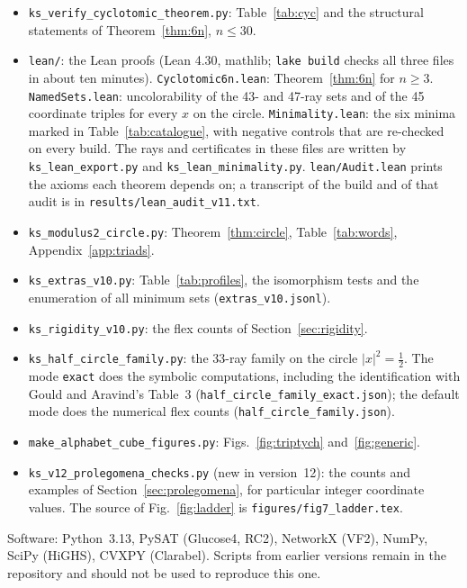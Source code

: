 \begin{itemize}
files \texttt{three\_symbol\_real\_*} under \texttt{results/}.  It uses \texttt{ks\_certify\_fast4.py}, the
certifier with the two reductions of Section~\ref{sec:methods}, which the mode \texttt{one4} of
\texttt{ks\_conjugate\_closed\_theorem.py} also uses.
\item \texttt{ks\_verify\_cyclotomic\_theorem.py}: Table~\ref{tab:cyc} and the structural
statements of Theorem~\ref{thm:6n}, $n\le30$.
\item \texttt{lean/}: the Lean proofs (Lean 4.30, mathlib; \texttt{lake build} checks all
three files in about ten minutes).  \texttt{Cyclotomic6n.lean}: Theorem~\ref{thm:6n} for
$n\ge3$.  \texttt{NamedSets.lean}: uncolorability of the 43- and 47-ray sets and of the 45
coordinate triples for every $x$ on the circle.  \texttt{Minimality.lean}: the six minima marked in
Table~\ref{tab:catalogue}, with negative controls that are re-checked on every build.  The rays
and certificates in these files are written by \texttt{ks\_lean\_export.py} and
\texttt{ks\_lean\_minimality.py}.  \texttt{lean/Audit.lean} prints the axioms each theorem
depends on; a transcript of the build and of that audit is in
\texttt{results/lean\_audit\_v11.txt}.
\item \texttt{ks\_modulus2\_circle.py}: Theorem~\ref{thm:circle}, Table~\ref{tab:words},
Appendix~\ref{app:triads}.
\item \texttt{ks\_extras\_v10.py}: Table~\ref{tab:profiles}, the isomorphism tests and the
enumeration of all minimum sets (\texttt{extras\_v10.jsonl}).
\item \texttt{ks\_rigidity\_v10.py}: the flex counts of Section~\ref{sec:rigidity}.
\item \texttt{ks\_half\_circle\_family.py}: the 33-ray family on the circle
$|x|^2=\tfrac12$.  The mode \texttt{exact} does the symbolic computations, including the
identification with Gould and Aravind's Table~3 (\texttt{half\_circle\_family\_exact.json}); the
default mode does the numerical flex counts (\texttt{half\_circle\_family.json}).
\item \texttt{make\_alphabet\_cube\_figures.py}: Figs.~\ref{fig:triptych} and~\ref{fig:generic}.
\item \texttt{ks\_v12\_prolegomena\_checks.py} (new in version~12): the counts and examples of
Section~\ref{sec:prolegomena}, for particular integer coordinate values.  The source of
Fig.~\ref{fig:ladder} is \texttt{figures/fig7\_ladder.tex}.
\end{itemize}

Software: Python~3.13, PySAT (Glucose4, RC2), NetworkX (VF2), NumPy, SciPy (HiGHS), CVXPY
(Clarabel).  Scripts from earlier versions remain in the repository and should not be used to
reproduce this one.

